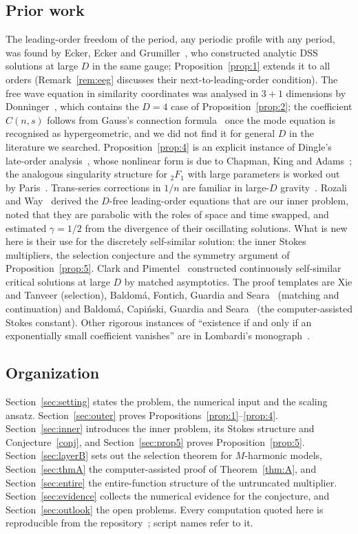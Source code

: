 \documentclass{amsart}
\numberwithin{equation}{section}
\theoremstyle{plain}
\theoremstyle{definition}
\theoremstyle{remark}
\begin{document}
\subsection*{Prior work}
The leading-order freedom of the period, any periodic profile with any period, was found by Ecker, Ecker and
Grumiller~\cite{EckerEckerGrumiller2026}, who constructed analytic DSS solutions at large $D$ in the same gauge;
Proposition~\ref{prop:1} extends it to all orders (Remark~\ref{rem:eeg} discusses their next-to-leading-order condition). The free wave equation in similarity coordinates was analysed in $3+1$
dimensions by Donninger~\cite{Donninger2009}, which contains the $D = 4$ case of Proposition~\ref{prop:2}; the
coefficient $C(n,s)$ follows from Gauss's connection formula~\cite[Eq.~15.8.4]{DLMF} once the mode equation is recognised
as hypergeometric, and we did not find it for general $D$ in the literature we searched. Proposition~\ref{prop:4} is an
explicit instance of Dingle's late-order analysis~\cite{Dingle1973}, whose nonlinear form is due to Chapman, King and
Adams~\cite{ChapmanKingAdams1998}; the analogous singularity structure for ${}_2F_1$ with large parameters is worked out
by Paris~\cite{Paris2013}. Trans-series corrections in $1/n$ are familiar in large-$D$ gravity~\cite{EmparanHerzog2020}.
Rozali and Way~\cite{RozaliWay2018} derived the $D$-free leading-order equations that are our inner problem, noted that
they are parabolic with the roles of space and time swapped, and estimated $\gamma = 1/2$ from the divergence of their
oscillating solutions. What is new here is their use for the discretely self-similar solution: the inner Stokes
multipliers, the selection conjecture and the symmetry argument of Proposition~\ref{prop:5}. Clark and
Pimentel~\cite{ClarkPimentel2025} constructed continuously self-similar critical solutions at large $D$ by matched
asymptotics. The proof templates are Xie and Tanveer (selection), Baldom\'a, Fontich, Guardia and
Seara~\cite{BaldomaFontichGuardiaSeara} (matching and continuation) and Baldom\'a, Capi\'nski, Guardia and
Seara~\cite{BaldomaCapinskiGuardiaSeara2023} (the computer-assisted Stokes constant). Other rigorous
instances of ``existence if and only if an exponentially small coefficient vanishes'' are in Lombardi's
monograph~\cite{Lombardi2000}.

\subsection*{Organization}
Section~\ref{sec:setting} states the problem, the numerical input and the scaling ansatz. Section~\ref{sec:outer} proves
Propositions~\ref{prop:1}--\ref{prop:4}. Section~\ref{sec:inner} introduces the inner problem, its Stokes structure and
Conjecture~\ref{conj}, and Section~\ref{sec:prop5} proves Proposition~\ref{prop:5}. Section~\ref{sec:layerB} sets out the
selection theorem for $M$-harmonic models, Section~\ref{sec:thmA} the computer-assisted proof of Theorem~\ref{thm:A}, and
Section~\ref{sec:entire} the entire-function structure of the untruncated multiplier. Section~\ref{sec:evidence} collects
the numerical evidence for the conjecture, and Section~\ref{sec:outlook} the open problems. Every computation quoted
here is reproducible from the repository~\cite{repo}; script names refer to it.
\end{document}
